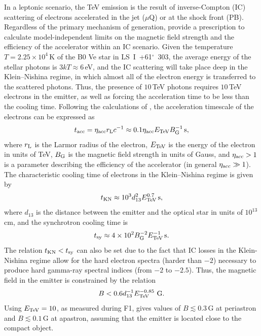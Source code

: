 \documentclass[preprint2]{aastex}
\newcommand{\tapp}{\raisebox{0.5ex}{\texttildelow}}
\newcommand{\lsi}{LS~I~+61$^{\circ}$~303}
\newcommand{\tev}{\,TeV}
\begin{document}
 In a leptonic scenario, the TeV emission is the result of inverse-Compton (IC) scattering of electrons accelerated in the jet ($\mu$Q) or at the shock front (PB). Regardless of the primary mechanism of generation, \citet{2008MNRAS.383..467K} provide a prescription to calculate model-independent limits on the magnetic field strength and the efficiency of the accelerator within an IC scenario. %
Given the temperature $T=2.25\times10^4$\,K \citep{2013A&ARv..21...64D} of the B0 Ve star in \lsi{}, the average energy of the stellar photons is $3kT \approx 6$\,eV, and the IC scattering will take place deep in the Klein--Nishina regime, in which almost all of the electron energy is transferred to the scattered photons. Thus, the presence of \tapp{}$10$\tev{} photons requires \tapp{}$10$\tev{} electrons in the emitter, as well as forcing the acceleration time to be less than the cooling time. Following the calculations of \citet{2008MNRAS.383..467K}, the acceleration timescale of the electrons can be expressed as
\begin{equation}
t_{\mbox{\scriptsize{acc}}} = \eta_{\mbox{\scriptsize{acc}}} r_{\mbox{\scriptsize{L}}} c^{-1} \approx 0.1 \eta_{\mbox{\scriptsize{acc}}} E_{\mbox{\scriptsize{TeV}}} B_{\mbox{\scriptsize{G}}}^{-1} \mbox{\,s},
\label{taccel}
\end{equation}
where $r_{\mbox{\scriptsize{L}}}$ is the Larmor radius of the electron, $E_{\mbox{\scriptsize{TeV}}}$ is the energy of the electron in units of TeV, $B_{\mbox{\scriptsize{G}}}$ is the magnetic field strength in units of Gauss, and $\eta_{\mbox{\scriptsize{acc}}} > 1$ is a parameter describing the efficiency of the accelerator (in general $\eta_{\mbox{\scriptsize{acc}}} \gg 1$). The characteristic cooling time of electrons in the Klein--Nishina regime is given by
\begin{equation}
t_{\mbox{\scriptsize{KN}}} \approx 10^3 d_{13}^2 E_{\mbox{\scriptsize{TeV}}}^{0.7} \mbox{\,s},
\end{equation}
where $d_{13}$ is the distance between the emitter and the optical star in units of $10^{13}$\,cm, and the synchrotron cooling time is 
\begin{equation}
t_{\mbox{\scriptsize{sy}}} \approx 4\times10^2 B_{\mbox{\scriptsize{G}}}^{-2} E_{\mbox{\scriptsize{TeV}}}^{-1} \mbox{\,s}.
\end{equation}
The relation $t_{\mbox{\scriptsize{KN}}} < t_{\mbox{\scriptsize{sy}}}$ can also be set due to the fact that IC losses in the Klein-Nishina regime allow for the hard electron spectra (harder than $-2$) necessary to produce hard gamma-ray spectral indices (from $-2$ to $-2.5$). Thus, the magnetic field in the emitter is constrained by the relation
\begin{equation}
{B < 0.6 d_{13}^{-1} E_{\mbox{\scriptsize{TeV}}}^{-0.85} \,\mbox{\,G}}.
\end{equation}
Using $ E_{\mbox{\scriptsize{TeV}}} = 10$, as measured during F1, gives values of $B \lesssim 0.3$\,G at periastron and $B \lesssim 0.1$\,G at apastron, assuming that the emitter is located close to the compact object.
\end{document}
